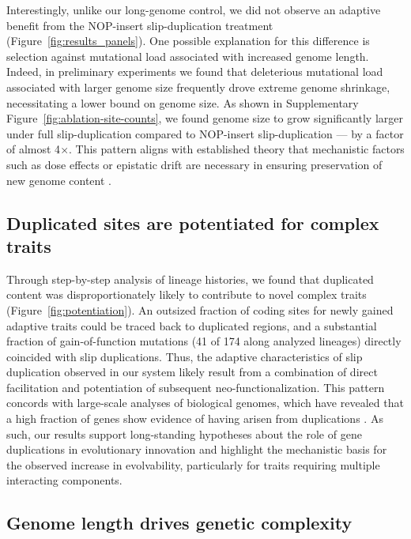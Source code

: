 Interestingly, unlike our long-genome control, we did not observe an adaptive benefit from the NOP-insert slip-duplication treatment (Figure~\ref{fig:results_panels}).
One possible explanation for this difference is selection against mutational load associated with increased genome length.
Indeed, in preliminary experiments we found that deleterious mutational load associated with larger genome size frequently drove extreme genome shrinkage, necessitating a lower bound on genome size.
As shown in Supplementary Figure~\ref{fig:ablation-site-counts}, we found genome size to grow significantly larger under full slip-duplication compared to NOP-insert slip-duplication --- by a factor of almost 4$\times$.
This pattern aligns with established theory that mechanistic factors such as dose effects or epistatic drift are necessary in ensuring preservation of new genome content \citep{Innan2010,Wagner1998,Tautz1992,Force1999,Bergthorsson2007}.

\subsection{Duplicated sites are potentiated for complex traits}

Through step-by-step analysis of lineage histories, we found that duplicated content was disproportionately likely to contribute to novel complex traits (Figure~\ref{fig:potentiation}).
An outsized fraction of coding sites for newly gained adaptive traits could be traced back to duplicated regions, and a substantial fraction of gain-of-function mutations (41 of 174 along analyzed lineages) directly coincided with slip duplications.
Thus, the adaptive characteristics of slip duplication observed in our system likely result from a combination of direct facilitation and potentiation of subsequent neo-functionalization.
This pattern concords with large-scale analyses of biological genomes, which have  revealed that a high fraction of genes show evidence of having arisen from duplications \citep{teichmann_structural_1998,Teichmann:2004cz}.
As such, our results support long-standing hypotheses about the role of gene duplications in evolutionary innovation and highlight the mechanistic basis for the observed increase in evolvability, particularly for traits requiring multiple interacting components.

\subsection{Genome length drives genetic complexity}


